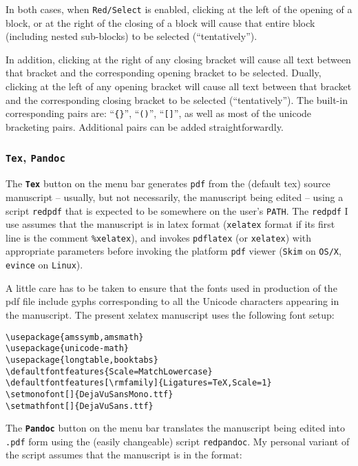 \documentclass[12pt,a4paper]{article}
\begin{document}
In both cases, when \texttt{Red/Select} is enabled, clicking at the left
of the opening of a block, or at the right of the closing of a block
will cause that entire block (including nested sub-blocks) to be
selected (``tentatively'').

In addition, clicking at the right of any closing bracket will cause all
text between that bracket and the corresponding opening bracket to be
selected. Dually, clicking at the left of any opening bracket will cause
all text between that bracket and the corresponding closing bracket to
be selected (``tentatively''). The built-in corresponding pairs are:
``\texttt{\{\}}'', ``\texttt{()}'', ``\texttt{{[}{]}}'', as well as most
of the unicode bracketing pairs. Additional pairs can be added
straightforwardly.

\hypertarget{tex-pandoc}{%
\subsubsection{\texorpdfstring{\texttt{Tex},
\texttt{Pandoc}}{Tex, Pandoc}}\label{tex-pandoc}}

The \textbf{\texttt{Tex}} button on the menu bar generates \texttt{pdf}
from the (default tex) source manuscript -- usually, but not
necessarily, the manuscript being edited -- using a script
\texttt{redpdf} that is expected to be somewhere on the user's
\texttt{PATH}. The \texttt{redpdf} I use assumes that the manuscript is
in latex format (\texttt{xelatex} format if its first line is the
comment \texttt{\%xelatex}), and invokes \texttt{pdflatex} (or
\texttt{xelatex}) with appropriate parameters before invoking the
platform \texttt{pdf} viewer (\texttt{Skim} on \texttt{OS/X},
\texttt{evince} on \texttt{Linux}).

A little care has to be taken to ensure that the fonts used in production
of the pdf file include gyphs corresponding to all the Unicode
characters appearing in the manuscript. The present xelatex manuscript
uses the following font setup:

\begin{verbatim}
\usepackage{amssymb,amsmath}
\usepackage{unicode-math}
\usepackage{longtable,booktabs}
\defaultfontfeatures{Scale=MatchLowercase}
\defaultfontfeatures[\rmfamily]{Ligatures=TeX,Scale=1}
\setmonofont[]{DejaVuSansMono.ttf}
\setmathfont[]{DejaVuSans.ttf}
\end{verbatim}

The \textbf{\texttt{Pandoc}} button on the menu bar translates the
manuscript being edited into \texttt{.pdf} form using the (easily
changeable) script \texttt{redpandoc}.  My personal variant of the
script assumes that the manuscript is in the format:
\end{document}

